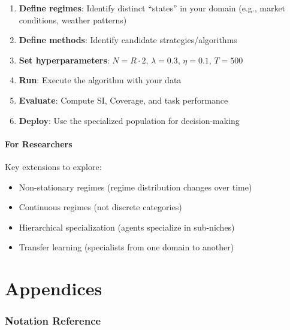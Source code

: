 \documentclass[11pt,a4paper]{article}
\theoremstyle{definition}
\theoremstyle{plain}
\begin{document}
\begin{enumerate}
    \item \textbf{Define regimes}: Identify distinct ``states'' in your domain (e.g., market conditions, weather patterns)
    \item \textbf{Define methods}: Identify candidate strategies/algorithms
    \item \textbf{Set hyperparameters}: $N = R \cdot 2$, $\lambda = 0.3$, $\eta = 0.1$, $T = 500$
    \item \textbf{Run}: Execute the algorithm with your data
    \item \textbf{Evaluate}: Compute SI, Coverage, and task performance
    \item \textbf{Deploy}: Use the specialized population for decision-making
\end{enumerate}

\subsection{For Researchers}

Key extensions to explore:
\begin{itemize}
    \item Non-stationary regimes (regime distribution changes over time)
    \item Continuous regimes (not discrete categories)
    \item Hierarchical specialization (agents specialize in sub-niches)
    \item Transfer learning (specialists from one domain to another)
\end{itemize}

\newpage
\appendix

\part*{Appendices}

\section{Notation Reference}
\end{document}
